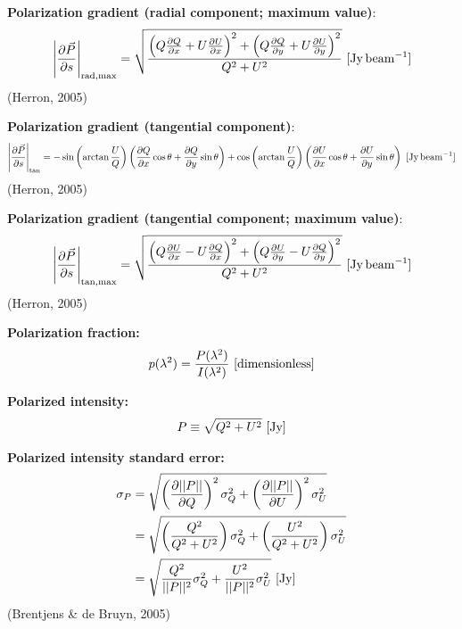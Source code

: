 \documentclass[a4paper,10pt]{article}
\begin{document}
{\noindent}\textbf{Polarization gradient (radial component; maximum value)}:
\begin{align*}
	\left\lvert\dfrac{\partial\vec{P}}{\partial s}\right\rvert_\mathrm{rad,max} = \sqrt{\frac{\left(Q\frac{\partial Q}{\partial x}+U\frac{\partial U}{\partial x}\right)^2 +\left(Q\frac{\partial Q}{\partial y}+U\frac{\partial U}{\partial y}\right)^2}{Q^2+U^2}} ~ [\rm Jy\,beam^{-1}]
\end{align*}
(Herron, 2005)

{\noindent}\textbf{Polarization gradient (tangential component)}:
\begin{align*}
	\left\lvert\dfrac{\partial\vec{P}}{\partial s}\right\rvert_\mathrm{tan} = -\sin\left(\arctan\frac{U}{Q}\right)\left(\frac{\partial Q}{\partial x}\cos\theta+\frac{\partial Q}{\partial y}\sin\theta\right) + \cos\left(\arctan\frac{U}{Q}\right)\left(\frac{\partial U}{\partial x}\cos\theta+\frac{\partial U}{\partial y}\sin\theta\right) ~ [\rm Jy\,beam^{-1}]
\end{align*}
(Herron, 2005)

{\noindent}\textbf{Polarization gradient (tangential component; maximum value)}:
\begin{align*}
	\left\lvert\dfrac{\partial\vec{P}}{\partial s}\right\rvert_\mathrm{tan,max} = \sqrt{\frac{\left(Q\frac{\partial U}{\partial x}-U\frac{\partial Q}{\partial x}\right)^2 +\left(Q\frac{\partial U}{\partial y}-U\frac{\partial Q}{\partial y}\right)^2}{Q^2+U^2}} ~ [\rm Jy\,beam^{-1}]
\end{align*}
(Herron, 2005)

{\noindent}\textbf{Polarization fraction:}
\begin{align*}
p(\lambda^2) = \dfrac{P(\lambda^2)}{I(\lambda^2)} ~ [{\rm dimensionless}]
\end{align*}

{\noindent}\textbf{Polarized intensity:}
\begin{align*}
    P\equiv\sqrt{Q^2+U^2} ~ [\rm Jy]
\end{align*}

{\noindent}\textbf{Polarized intensity standard error:}
\begin{align*}
\sigma_P &= \sqrt{ \left(\dfrac{\partial\lvert\lvert P \rvert\rvert}{\partial Q}\right)^2\sigma_Q^2 + \left(\dfrac{\partial\lvert\lvert P \rvert\rvert}{\partial U}\right)^2\sigma_U^2 } \\
&= \sqrt{ \left(\dfrac{Q^2}{Q^2+U^2}\right)\sigma_Q^2 + \left(\dfrac{U^2}{Q^2+U^2}\right)\sigma_U^2 } \\
&= \sqrt{ \dfrac{Q^2}{\lvert\lvert P \rvert\rvert^2}\sigma_Q^2 + \dfrac{U^2}{\lvert\lvert P \rvert\rvert^2}\sigma_U^2 } ~ [\rm Jy]
\end{align*}
(Brentjens \& de Bruyn, 2005)
\end{document}
